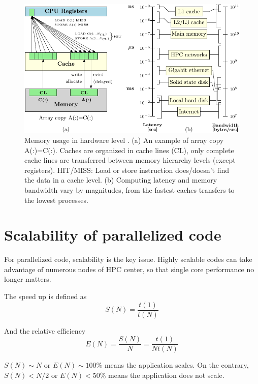 \begin{figure}[h]
\begin{centering}
\includegraphics{_figure/memory}
\par\end{centering}

\caption[Memory usage in hardware level]{Memory usage in hardware level \citep{LRZ-cours}. (a) An example
of array copy A(:)=C(:). Caches are organized in cache lines (CL),
only complete cache lines are transferred between memory hierarchy
levels (except registers). HIT/MISS: Load or store instruction does/doesn't
find the data in a cache level. (b) Computing latency and memory bandwidth
vary by magnitudes, from the fastest caches transfers to the lowest
processes.\label{fig:Memory}}
\end{figure}



\section{Scalability of parallelized code}

For parallelized code, scalability is the key issue. Highly scalable
codes can take advantage of numerous nodes of HPC center, so that
single core performance no longer matters. 

The speed up is defined as
\begin{equation}
S(N)=\dfrac{t(1)}{t(N)}
\end{equation}


And the relative efficiency
\begin{equation}
E(N)=\dfrac{S(N)}{N}=\dfrac{t(1)}{Nt(N)}
\end{equation}


$S(N)\sim N$ or $E(N)\sim100\%$ means the application scales. On
the contrary, $S(N)<N/2$ or $E(N)<50\%$ means the application does
not scale. 

